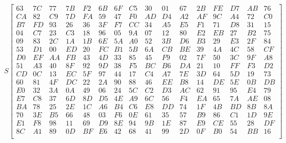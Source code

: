 $$
S
\begin{bmatrix}
63 & 7C & 77 & 7B & F2 & 6B & 6F & C5 & 30 & 01 & 67 & 2B & FE & D7 & AB & 76 \\
CA & 82 & C9 & 7D & FA & 59 & 47 & F0 & AD & D4 & A2 & AF & 9C & A4 & 72 & C0 \\
B7 & FD & 93 & 26 & 36 & 3F & F7 & CC & 34 & A5 & E5 & F1 & 71 & D8 & 31 & 15 \\
04 & C7 & 23 & C3 & 18 & 96 & 05 & 9A & 07 & 12 & 80 & E2 & EB & 27 & B2 & 75 \\
09 & 83 & 2C & 1A & 1B & 6E & 5A & A0 & 52 & 3B & D6 & B3 & 29 & E3 & 2F & 84 \\
53 & D1 & 00 & ED & 20 & FC & B1 & 5B & 6A & CB & BE & 39 & 4A & 4C & 58 & CF \\
D0 & EF & AA & FB & 43 & 4D & 33 & 85 & 45 & F9 & 02 & 7F & 50 & 3C & 9F & A8 \\
51 & A3 & 40 & 8F & 92 & 9D & 38 & F5 & BC & B6 & DA & 21 & 10 & FF & F3 & D2 \\
CD & 0C & 13 & EC & 5F & 97 & 44 & 17 & C4 & A7 & 7E & 3D & 64 & 5D & 19 & 73 \\
60 & 81 & 4F & DC & 22 & 2A & 90 & 88 & 46 & EE & B8 & 14 & DE & 5E & 0B & DB \\
E0 & 32 & 3A & 0A & 49 & 06 & 24 & 5C & C2 & D3 & AC & 62 & 91 & 95 & E4 & 79 \\
E7 & C8 & 37 & 6D & 8D & D5 & 4E & A9 & 6C & 56 & F4 & EA & 65 & 7A & AE & 08 \\
BA & 78 & 25 & 2E & 1C & A6 & B4 & C6 & E8 & DD & 74 & 1F & 4B & BD & 8B & 8A \\
70 & 3E & B5 & 66 & 48 & 03 & F6 & 0E & 61 & 35 & 57 & B9 & 86 & C1 & 1D & 9E \\
E1 & F8 & 98 & 11 & 69 & D9 & 8E & 94 & 9B & 1E & 87 & E9 & CE & 55 & 28 & DF \\
8C & A1 & 89 & 0D & BF & E6 & 42 & 68 & 41 & 99 & 2D & 0F & B0 & 54 & BB & 16 \\
\end{bmatrix}
$$

